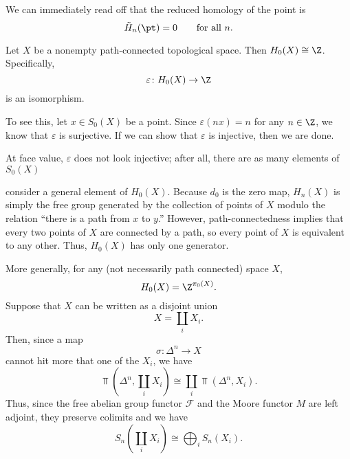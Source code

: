 \documentclass[main.tex]{subfiles}
\begin{document}
\begin{example}
 We can immediately read off that the reduced homology of the point is
  \begin{equation*}
    \tilde{H}_{n}(\pt) = 0\qquad \text{for all }n.
  \end{equation*}
\end{example}

\begin{example}
  Let $X$ be a nonempty path-connected topological space. Then $H_{0}(X) \cong \Z$. Specifically,
  \begin{equation*}
    \varepsilon\colon H_{0}(X) \to \Z
  \end{equation*}
  is an isomorphism.

  To see this, let $x \in S_{0}(X)$ be a point. Since $\varepsilon(nx) = n$ for any $n \in \Z$, we know that $\varepsilon$ is surjective. If we can show that $\varepsilon$ is injective, then we are done.

  At face value, $\varepsilon$ does not look injective; after all, there are as many elements of $S_{0}(X)$

  consider a general element of $H_{0}(X)$. Because $d_{0}$ is the zero map, $H_{n}(X)$ is simply the free group generated by the collection of points of $X$ modulo the relation ``there is a path from $x$ to $y$.'' However, path-connectedness implies that every two points of $X$ are connected by a path, so every point of $X$ is equivalent to any other. Thus, $H_{0}(X)$ has only one generator.
\end{example}

\begin{example}
  More generally, for any (not necessarily path connected) space $X$,
  \begin{equation*}
    H_{0}(X) = \Z^{\pi_{0}(X)}.
  \end{equation*}
  Suppose that $X$ can be written as a disjoint union
  \begin{equation*}
    X = \coprod_{i} X_{i}.
  \end{equation*}
  Then, since a map
  \begin{equation*}
    \sigma\colon \Delta^{n} \to X
  \end{equation*}
  cannot hit more that one of the $X_{i}$, we have
  \begin{equation*}
    \Top\left(\Delta^{n}, \coprod_{i} X_{i}\right) \cong \coprod_{i} \Top(\Delta^{n}, X_{i}).
  \end{equation*}
  Thus, since the free abelian group functor $\mathcal{F}$ and the Moore functor $M$ are left adjoint, they preserve colimits and we have
  \begin{equation*}
    S_{n}\left(\coprod_{i} X_{i}\right) \cong \bigoplus_{i} S_{n}(X_{i}).
  \end{equation*}
\end{example}
\end{document}
